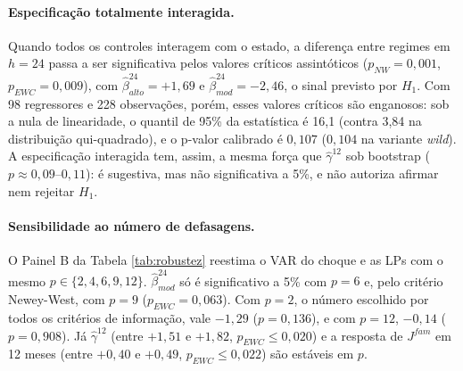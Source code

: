 \documentclass[12pt,a4paper]{article}
\begin{document}
\paragraph{Especificação totalmente interagida.} Quando todos os controles interagem com o estado, a diferença entre regimes em $h = 24$ passa a ser significativa pelos valores críticos assintóticos ($p_{NW} = 0{,}001$, $p_{EWC} = 0{,}009$), com $\hat{\beta}_{alto}^{24} = +1{,}69$ e $\hat{\beta}_{mod}^{24} = -2{,}46$, o sinal previsto por $H_1$. Com 98 regressores e 228 observações, porém, esses valores críticos são enganosos: sob a nula de linearidade, o quantil de 95\% da estatística é 16,1 (contra 3,84 na distribuição qui-quadrado), e o p-valor calibrado é $0{,}107$ ($0{,}104$ na variante \textit{wild}). A especificação interagida tem, assim, a mesma força que $\hat{\gamma}^{12}$ sob bootstrap ($p \approx 0{,}09$--$0{,}11$): é sugestiva, mas não significativa a 5\%, e não autoriza afirmar nem rejeitar $H_1$.

\paragraph{Sensibilidade ao número de defasagens.} O Painel B da Tabela \ref{tab:robustez} reestima o VAR do choque e as LPs com o mesmo $p \in \{2, 4, 6, 9, 12\}$. $\hat{\beta}_{mod}^{24}$ só é significativo a 5\% com $p = 6$ e, pelo critério Newey-West, com $p = 9$ ($p_{EWC} = 0{,}063$). Com $p = 2$, o número escolhido por todos os critérios de informação, vale $-1{,}29$ ($p = 0{,}136$), e com $p = 12$, $-0{,}14$ ($p = 0{,}908$). Já $\hat{\gamma}^{12}$ (entre $+1{,}51$ e $+1{,}82$, $p_{EWC} \le 0{,}020$) e a resposta de $J^{fam}$ em 12 meses (entre $+0{,}40$ e $+0{,}49$, $p_{EWC} \le 0{,}022$) são estáveis em $p$.
\end{document}
